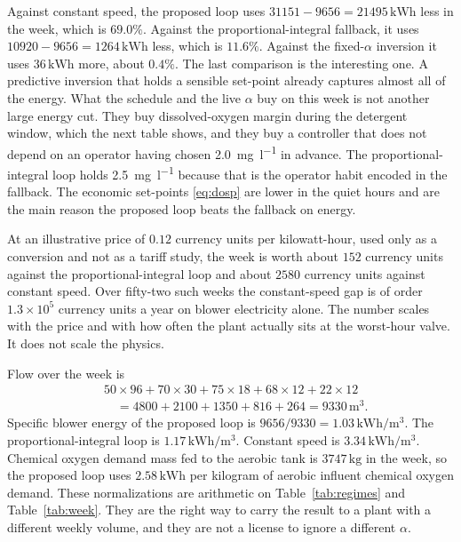 Against constant speed, the proposed loop uses $31151-9656=21495\,\mathrm{kWh}$ less in the week, which is $69.0\%$. Against the proportional-integral fallback, it uses $10920-9656=1264\,\mathrm{kWh}$ less, which is $11.6\%$. Against the fixed-$\alpha$ inversion it uses $36\,\mathrm{kWh}$ more, about $0.4\%$. The last comparison is the interesting one. A predictive inversion that holds a sensible set-point already captures almost all of the energy. What the schedule and the live $\alpha$ buy on this week is not another large energy cut. They buy dissolved-oxygen margin during the detergent window, which the next table shows, and they buy a controller that does not depend on an operator having chosen \SI{2.0}{\milli\gram\per\litre} in advance. The proportional-integral loop holds \SI{2.5}{\milli\gram\per\litre} because that is the operator habit encoded in the fallback. The economic set-points \eqref{eq:dosp} are lower in the quiet hours and are the main reason the proposed loop beats the fallback on energy.

At an illustrative price of $0.12$ currency units per kilowatt-hour, used only as a conversion and not as a tariff study, the week is worth about $152$ currency units against the proportional-integral loop and about $2580$ currency units against constant speed. Over fifty-two such weeks the constant-speed gap is of order $1.3\times 10^{5}$ currency units a year on blower electricity alone. The number scales with the price and with how often the plant actually sits at the worst-hour valve. It does not scale the physics.

Flow over the week is
\begin{equation}
\begin{aligned}
&50\times 96
+
70\times 30
+
75\times 18
+
68\times 12
+
22\times 12
\\
&\quad
=
4800+2100+1350+816+264
=
9330\,\mathrm{m^{3}}.
\end{aligned}
\end{equation}
Specific blower energy of the proposed loop is $9656/9330=1.03\,\mathrm{kWh/m^{3}}$. The proportional-integral loop is $1.17\,\mathrm{kWh/m^{3}}$. Constant speed is $3.34\,\mathrm{kWh/m^{3}}$. Chemical oxygen demand mass fed to the aerobic tank is $3747\,\mathrm{kg}$ in the week, so the proposed loop uses $2.58\,\mathrm{kWh}$ per kilogram of aerobic influent chemical oxygen demand. These normalizations are arithmetic on Table~\ref{tab:regimes} and Table~\ref{tab:week}. They are the right way to carry the result to a plant with a different weekly volume, and they are not a license to ignore a different $\alpha$.

